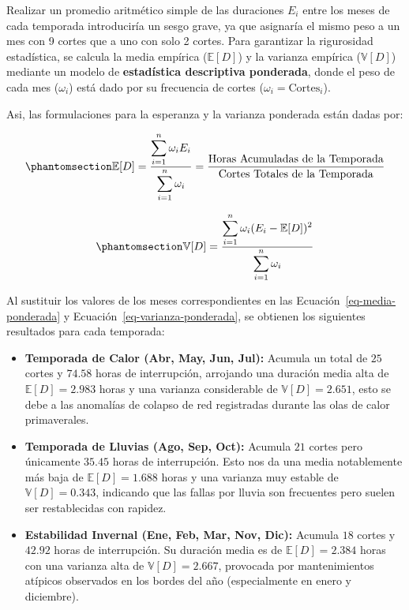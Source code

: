 \documentclass[
  spanish,
  us-letterpaper,
]{scrreprt}
\providecommand{\tightlist}{%
  \setlength{\itemsep}{0pt}\setlength{\parskip}{0pt}}
\numberwithin{equation}{section}
\theoremstyle{plain}
\theoremstyle{plain}
\theoremstyle{plain}
\theoremstyle{definition}
\theoremstyle{remark}
\begin{document}
Realizar un promedio aritmético simple de las duraciones \(E_i\) entre
los meses de cada temporada introduciría un sesgo grave, ya que
asignaría el mismo peso a un mes con 9 cortes que a uno con solo 2
cortes. Para garantizar la rigurosidad estadística, se calcula la media
empírica (\(\mathbb{E}[D]\)) y la varianza empírica (\(\mathbb{V}[D]\))
mediante un modelo de \textbf{estadística descriptiva ponderada}, donde
el peso de cada mes (\(\omega_i\)) está dado por su frecuencia de cortes
(\(\omega_i = \text{Cortes}_i\)).

Asi, las formulaciones para la esperanza y la varianza ponderada están
dadas por:

\begin{equation}\phantomsection\label{eq-media-ponderada}{
\displaystyle \mathbb{E}[D] = \displaystyle \dfrac{\displaystyle \sum_{i=1}^{n} \omega_i E_i}{\displaystyle \sum_{i=1}^{n} \omega_i} = \frac{\text{Horas Acumuladas de la Temporada}}{\text{Cortes Totales de la Temporada}}
}\end{equation}

\begin{equation}\phantomsection\label{eq-varianza-ponderada}{
\displaystyle \mathbb{V}[D] = \displaystyle \frac{\displaystyle \sum_{i=1}^{n} \omega_i (E_i - \mathbb{E}[D])^2}{\displaystyle \sum_{i=1}^{n} \omega_i}
}\end{equation}

Al sustituir los valores de los meses correspondientes en las
Ecuación~\ref{eq-media-ponderada} y
Ecuación~\ref{eq-varianza-ponderada}, se obtienen los siguientes
resultados para cada temporada:

\begin{itemize}
\tightlist
\item
  \textbf{Temporada de Calor (Abr, May, Jun, Jul):} Acumula un total de
  \(25\) cortes y \(74.58\) horas de interrupción, arrojando una
  duración media alta de \(\mathbb{E}[D] = 2.983\) horas y una varianza
  considerable de \(\mathbb{V}[D] = 2.651\), esto se debe a las
  anomalías de colapso de red registradas durante las olas de calor
  primaverales.
\item
  \textbf{Temporada de Lluvias (Ago, Sep, Oct):} Acumula \(21\) cortes
  pero únicamente \(35.45\) horas de interrupción. Esto nos da una media
  notablemente más baja de \(\mathbb{E}[D] = 1.688\) horas y una
  varianza muy estable de \(\mathbb{V}[D] = 0.343\), indicando que las
  fallas por lluvia son frecuentes pero suelen ser restablecidas con
  rapidez.
\item
  \textbf{Estabilidad Invernal (Ene, Feb, Mar, Nov, Dic):} Acumula
  \(18\) cortes y \(42.92\) horas de interrupción. Su duración media es
  de \(\mathbb{E}[D] = 2.384\) horas con una varianza alta de
  \(\mathbb{V}[D] = 2.667\), provocada por mantenimientos atípicos
  observados en los bordes del año (especialmente en enero y diciembre).
\end{itemize}
\end{document}
